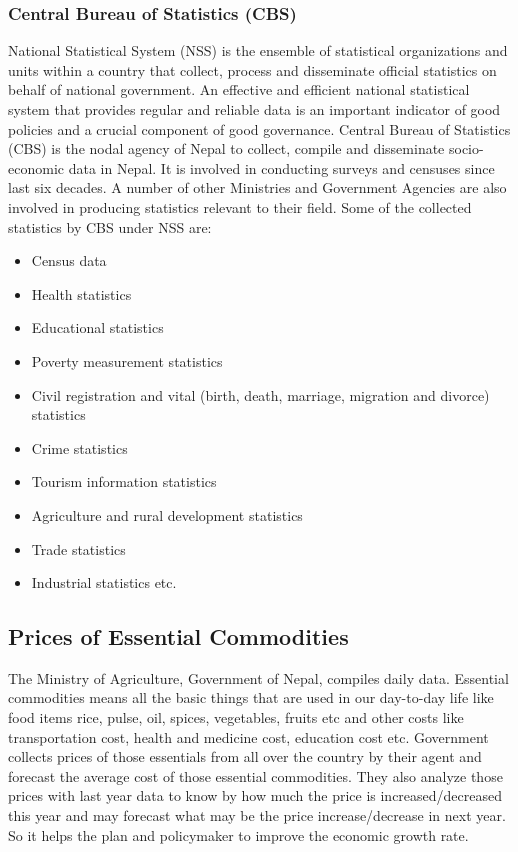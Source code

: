 \subsubsection*{Central Bureau of Statistics (CBS)}
National Statistical System (NSS) is the ensemble of statistical organizations and units within a country that collect, process and disseminate
official statistics on behalf of national government. An effective and efficient national statistical system that
provides regular and reliable data is an important indicator of good policies and a crucial component of good
governance. Central Bureau of Statistics (CBS) is the nodal agency of Nepal to collect, compile and disseminate
socio-economic data in Nepal. It is involved in conducting surveys and censuses since last six decades. A number of
other Ministries and Government Agencies are also involved in producing statistics relevant to their field. Some of the collected statistics by CBS under NSS are:
\begin{multicols}{2}
\begin{itemize}
	\item Census data
	\item Health statistics
	\item Educational statistics
	\item Poverty measurement statistics
	\item Civil registration and vital (birth, death, marriage, migration and divorce) statistics
	\item Crime statistics
	\item Tourism information statistics
	\item Agriculture and rural development statistics
	\item Trade statistics
	\item Industrial statistics etc.
\end{itemize}
\end{multicols}


\subsection*{Prices of Essential Commodities}
The Ministry of Agriculture, Government of Nepal, compiles daily
data. Essential commodities means all the basic things that are used in our day-to-day life like food items rice, pulse, oil, spices, vegetables, fruits etc and other costs like transportation cost, health and medicine cost, education cost etc. Government collects prices of those essentials from all over the country by their agent and forecast the average cost of those essential commodities. They also analyze those prices with last year data to know by how much the price is increased/decreased this year and may forecast what may be the price increase/decrease in next year. So it helps the plan and policymaker to improve the economic growth rate.



